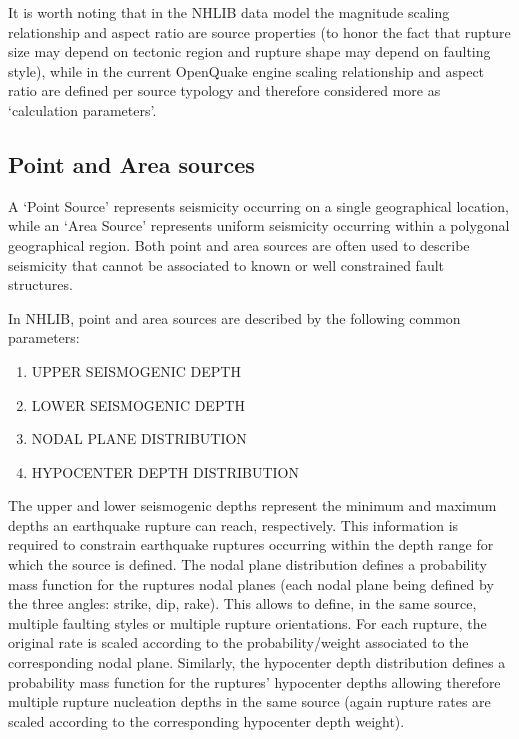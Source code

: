 \documentclass[11pt,a4paper,headings=small,dvips]{scrartcl}
\begin{document}
It is worth noting that in the NHLIB data model the magnitude scaling 
relationship and aspect ratio are source properties (to honor the fact 
that rupture size may depend on tectonic region and rupture shape may 
depend on faulting style), while in the current OpenQuake engine scaling 
relationship and aspect ratio are defined per source typology and 
therefore considered more as `calculation parameters'.


\subsection{Point and Area sources}
\setcounter{figure}{0}
A `Point Source' represents seismicity occurring on a single geographical 
location, while an `Area Source' represents uniform seismicity occurring
within a polygonal geographical region.  Both point and area sources are 
often used to describe seismicity that cannot be associated to known or 
well constrained fault structures.

In NHLIB, point and area sources are described by the following common 
parameters:
\begin{enumerate}
\item UPPER SEISMOGENIC DEPTH
\item LOWER SEISMOGENIC DEPTH
\item NODAL PLANE DISTRIBUTION
\item HYPOCENTER DEPTH DISTRIBUTION
\end{enumerate}
The upper and lower seismogenic depths represent the minimum and maximum 
depths an earthquake rupture can reach, respectively. This information is 
required to constrain earthquake ruptures occurring within the depth range 
for which the source is defined. 
The nodal plane distribution defines a probability mass function for the 
ruptures nodal planes (each nodal plane being defined by the three angles: 
strike, dip, rake). This allows to define, in the same source, multiple 
faulting styles or multiple rupture orientations. For each rupture, the 
original rate is scaled according to the probability/weight associated 
to the corresponding nodal plane. Similarly, the hypocenter depth 
distribution defines a probability mass function for the ruptures' 
hypocenter depths allowing therefore multiple rupture nucleation depths 
in the same source (again rupture rates are scaled according to the 
corresponding hypocenter depth weight).
\end{document}
